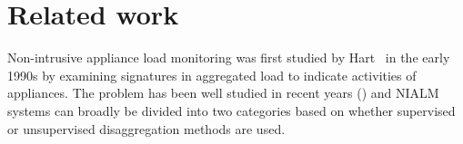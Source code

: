 \documentclass[conference]{IEEEtran}
\begin{document}
\section{Related work}
\noindent Non-intrusive appliance load monitoring was first studied by Hart~\cite{hart} in the early 1990s by examining signatures in aggregated load to indicate activities of appliances. The problem has been well studied in recent years (\cite{survey1,survey2,survey3}) and NIALM systems can broadly be divided into two categories based on whether supervised or unsupervised disaggregation methods are used.
\end{document}
